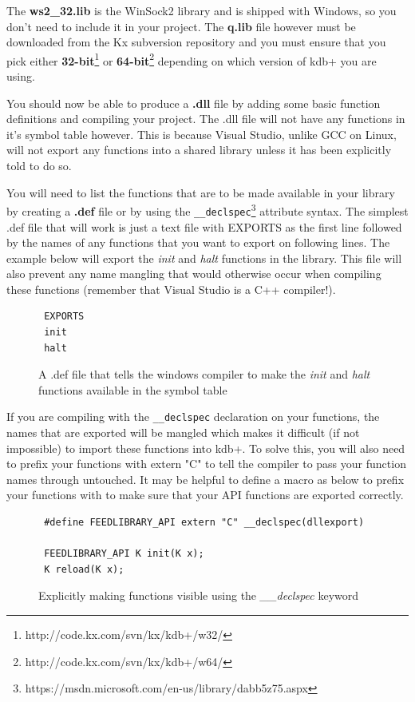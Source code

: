  The \textbf{ws2\_32.lib} is the WinSock2 library and is shipped with Windows, so you don't need to include it in your project. The \textbf{q.lib} file however must be downloaded from the Kx subversion repository and you must ensure that you pick either \textbf{32-bit}\footnote{http://code.kx.com/svn/kx/kdb+/w32/} or \textbf{64-bit}\footnote{http://code.kx.com/svn/kx/kdb+/w64/} depending on which version of kdb+ you are using.
 
 You should now be able to produce a \textbf{.dll} file by adding some basic function definitions and compiling your project. The .dll file will not have any functions in it's symbol table however. This is because Visual Studio, unlike GCC on Linux, will not export any functions into a shared library unless it has been explicitly told to do so. 
 
 You will need to list the functions that are to be made available in your library by creating a \textbf{.def} file or by using the \verb|__declspec|\footnote{https://msdn.microsoft.com/en-us/library/dabb5z75.aspx} attribute syntax. The simplest .def file that will work is just a text file with EXPORTS as the first line followed by the names of any functions that you want to export on following lines. The example below will export the \textit{init} and \textit{halt} functions in the library. This file will also prevent any name mangling that would otherwise occur when compiling these functions (remember that Visual Studio is a C++ compiler!).
 
 \begin{figure}[H]
 \begin{lstlisting}
 EXPORTS
 init
 halt
 \end{lstlisting}
 \caption{A .def file that tells the windows compiler to make the \textit{init} and \textit{halt} functions available in the symbol table}
 \end{figure}
 
 If you are compiling with the \verb|__declspec| declaration on your functions, the names that are exported will be mangled which makes it difficult (if not impossible) to import these functions into kdb+. To solve this, you will also need to prefix your functions with extern "C" to tell the compiler to pass your function names through untouched. It may be helpful to define a macro as below to prefix your functions with to make sure that your API functions are exported correctly.

\begin{figure}[H]
 \begin{lstlisting}
 #define FEEDLIBRARY_API extern "C" __declspec(dllexport)
 
 FEEDLIBRARY_API K init(K x);
 K reload(K x);
 \end{lstlisting}
 \caption{Explicitly making functions visible using the \textit{\_\_declspec} keyword}
 \end{figure}
 
